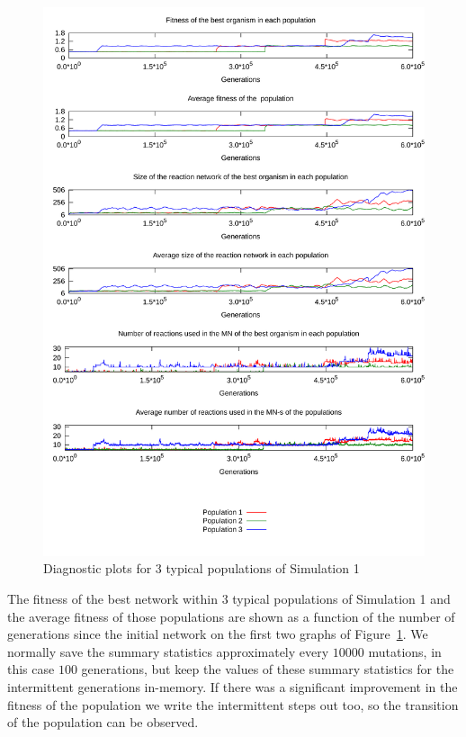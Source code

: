 \documentclass[a4paper,12pt]{article}
\begin{document}
\begin{figure}[htpb]
	\centering
	\includegraphics[width=0.8\linewidth]{simulation1.pdf}
	\caption{Diagnostic plots for 3 typical populations of Simulation 1}
	\label{fig:simulation1}
\end{figure}


The fitness of the best network within $3$ typical populations of Simulation 1 and the average fitness of those populations are shown as a function of the number of generations since the initial network on the first two graphs of Figure~\ref{fig:simulation1}. We normally save the summary statistics approximately every $10000$ mutations, in this case $100$ generations, but keep the values of these summary statistics for the intermittent generations in-memory. If there was a significant improvement in the fitness of the population we write the intermittent steps out too, so the transition of the population can be observed. 
\end{document}
